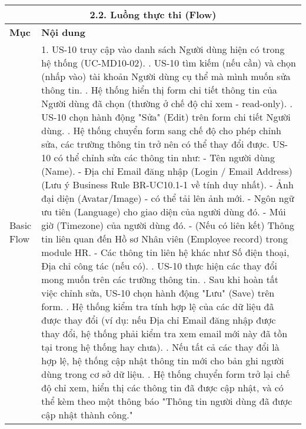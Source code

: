 \begin{longtable}{|m{4cm}|p{11cm}|}
\hline
\multicolumn{2}{|c|}{\textbf{2.2. Luồng thực thi (Flow)}} \\
\hline
\textbf{Mục} & \textbf{Nội dung} \\
\hline
Basic Flow & 1. US-10 truy cập vào danh sách Người dùng hiện có trong hệ thống (UC-MD10-02). \newline 2. US-10 tìm kiếm (nếu cần) và chọn (nhấp vào) tài khoản Người dùng cụ thể mà mình muốn sửa thông tin. \newline 3. Hệ thống hiển thị form chi tiết thông tin của Người dùng đã chọn (thường ở chế độ chỉ xem - read-only). \newline 4. US-10 chọn hành động "Sửa" (Edit) trên form chi tiết Người dùng. \newline 5. Hệ thống chuyển form sang chế độ cho phép chỉnh sửa, các trường thông tin trở nên có thể thay đổi được. US-10 có thể chỉnh sửa các thông tin như: \newline    - Tên người dùng (Name). \newline    - Địa chỉ Email đăng nhập (Login / Email Address) (Lưu ý Business Rule BR-UC10.1-1 về tính duy nhất). \newline    - Ảnh đại diện (Avatar/Image) - có thể tải lên ảnh mới. \newline    - Ngôn ngữ ưu tiên (Language) cho giao diện của người dùng đó. \newline    - Múi giờ (Timezone) của người dùng đó. \newline    - (Nếu có liên kết) Thông tin liên quan đến Hồ sơ Nhân viên (Employee record) trong module HR. \newline    - Các thông tin liên hệ khác như Số điện thoại, Địa chỉ công tác (nếu có). \newline 6. US-10 thực hiện các thay đổi mong muốn trên các trường thông tin. \newline 7. Sau khi hoàn tất việc chỉnh sửa, US-10 chọn hành động "Lưu" (Save) trên form. \newline 8. Hệ thống kiểm tra tính hợp lệ của các dữ liệu đã được thay đổi (ví dụ: nếu Địa chỉ Email đăng nhập được thay đổi, hệ thống phải kiểm tra xem email mới này đã tồn tại trong hệ thống hay chưa). \newline 9. Nếu tất cả các thay đổi là hợp lệ, hệ thống cập nhật thông tin mới cho bản ghi người dùng trong cơ sở dữ liệu. \newline 10. Hệ thống chuyển form trở lại chế độ chỉ xem, hiển thị các thông tin đã được cập nhật, và có thể kèm theo một thông báo "Thông tin người dùng đã được cập nhật thành công." \\

\end{longtable}

